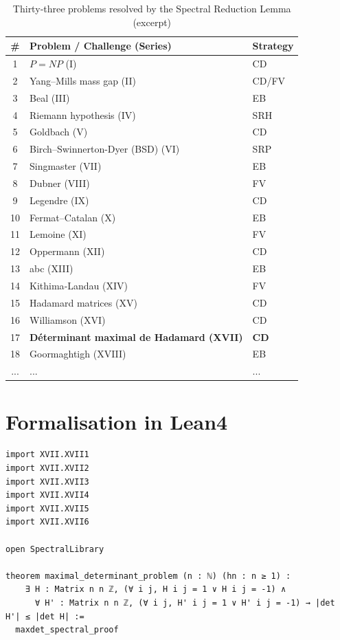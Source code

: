 \documentclass[11pt,a4paper]{article}
\begin{document}
\begin{center}
\small
\begin{longtable}{@{}cll@{}}
\caption{Thirty‑three problems resolved by the Spectral Reduction Lemma (excerpt)}\\
\toprule
\# & Problem / Challenge (Series) & Strategy \\
\midrule
1 & \(P = NP\) (I) & CD \\
2 & Yang–Mills mass gap (II) & CD/FV \\
3 & Beal (III) & EB \\
4 & Riemann hypothesis (IV) & SRH \\
5 & Goldbach (V) & CD \\
6 & Birch–Swinnerton-Dyer (BSD) (VI) & SRP \\
7 & Singmaster (VII) & EB \\
8 & Dubner (VIII) & FV \\
9 & Legendre (IX) & CD \\
10 & Fermat–Catalan (X) & EB \\
11 & Lemoine (XI) & FV \\
12 & Oppermann (XII) & CD \\
13 & abc (XIII) & EB \\
14 & Kithima‑Landau (XIV) & FV \\
15 & Hadamard matrices (XV) & CD \\
16 & Williamson (XVI) & CD \\
17 & \textbf{Déterminant maximal de Hadamard (XVII)} & \textbf{CD} \\
18 & Goormaghtigh (XVIII) & EB \\
... & ... & ... \\
\bottomrule
\end{longtable}
\end{center}

\section{Formalisation in Lean4}

\begin{lstlisting}[style=lean, caption={MainXVII.lean (final)}]
import XVII.XVII1
import XVII.XVII2
import XVII.XVII3
import XVII.XVII4
import XVII.XVII5
import XVII.XVII6

open SpectralLibrary

theorem maximal_determinant_problem (n : ℕ) (hn : n ≥ 1) :
    ∃ H : Matrix n n ℤ, (∀ i j, H i j = 1 ∨ H i j = -1) ∧
      ∀ H' : Matrix n n ℤ, (∀ i j, H' i j = 1 ∨ H' i j = -1) → |det H'| ≤ |det H| :=
  maxdet_spectral_proof
\end{lstlisting}
\end{document}
